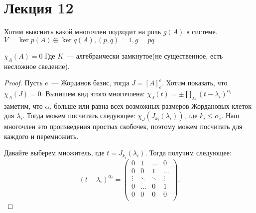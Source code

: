 \section*{Лекция 12}
\begin{motivation}
    Хотим выяснить какой многочлен подходит на роль $g(A)$ в системе.
    $V = \ker p(A) \oplus \ker q(A), (p,q) = 1, g= pq$
\end{motivation}
\begin{theorem}
   $\chi_A(A) = 0$
   Где $K$~--- алгебраически замкнутое(не существенное, есть несложное сведение).
\end{theorem}
\begin{proof}
    Пусть $e$~--- Жорданов базис, тогда $J = [A]^e_e$.
    Хотим показать, что $\chi_A(J) = 0$.
    Выпишем вид этого многочлена: $\chi_J(t) = \pm\prod\limits_{\lambda_i}^{}{(t-\lambda_i)^{\alpha_i}}$
    заметим, что $\alpha_i$ больше или равна всех возможных размеров Жордановых клеток 
    для $\lambda_i$.
    Тогда можем посчитать следующее:
    $\chi_J(J_{k_i}(\lambda_i))$, где $k_i \le \alpha_i$.
    Наш многочлен это произведения простых скобочек, поэтому можем посчитать для
    каждого и перемножить. 

    Давайте выберем множитель, где $t= J_{k_i}(\lambda_i)$.
    Тогда получим следующее:
     \[
         (t - \lambda_i)^{\alpha_i}  = 
         \begin{pmatrix}
             0 & 1 & \dots & 0\\
             0 & 0 & 1 & \dots\\
             \vdots & \ddots & \ddots & \vdots\\
             0 & \dots & 0 & 1\\
             0 & 0 & 0 & 0\\
         \end{pmatrix}
    .\] 
\end{proof}

